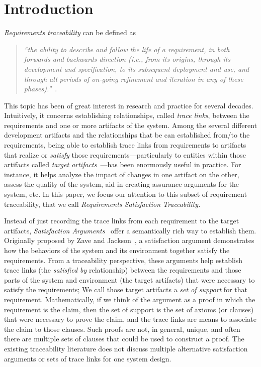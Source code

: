 \section{Introduction}

\emph{Requirements traceability} can be defined as
\begin{quotation}
\textit{``the ability to describe and follow the life of a requirement, in both forwards and backwards direction (i.e., from its origins, through its development and specification, to its subsequent deployment and use, and through all periods of on-going refinement and iteration in any of these phases).''}~\cite{gotel}.
\end{quotation}
This topic has been of great interest in research and practice for several decades. Intuitively, it concerns establishing relationships, called \emph{trace links}, between the requirements and one or more artifacts of the system. Among the several different development artifacts and the relationships that be can established from/to the requirements, being able to establish trace links from requirements to artifacts that realize or \emph{satisfy} those requirements---particularly to entities within those artifacts called \emph{target artifacts}~\cite{gotel2012traceability}---has been enormously useful in practice. For instance, it helps analyze the impact of changes in one artifact on the other, assess the quality of the system, aid in creating assurance arguments for the system, etc. In this paper, we focus our attention to this subset of requirement traceability, that we call \emph{Requirements Satisfaction Traceability.}

Instead of just recording the trace links from each requirement to the target artifacts, \emph{Satisfaction Arguments}~\cite{zave1997four} offer a semantically rich way to establish them. Originally proposed by Zave and Jackson~\cite{zave1997four}, a satisfaction argument demonstrates how the behaviors of the system and its environment together satisfy the requirements. From a traceability perspective, these arguments help establish trace links (the \emph{satisfied by} relationship) between the requirements and those parts of the system and environment (the target artifacts) that were necessary to satisfy the requirements; We call those target artifacts a \emph{set of support} for that requirement. Mathematically, if we think of the argument as a proof in which the requirement is the claim, then the set of support is the set of axioms (or clauses) that were necessary to prove the claim, and the trace links are means to associate the claim to those clauses. Such proofs are not, in general, unique, and often there are multiple sets of clauses that could be used to construct a proof.  The existing traceability literature does not discuss multiple alternative satisfaction arguments or sets of trace links for one system design.

